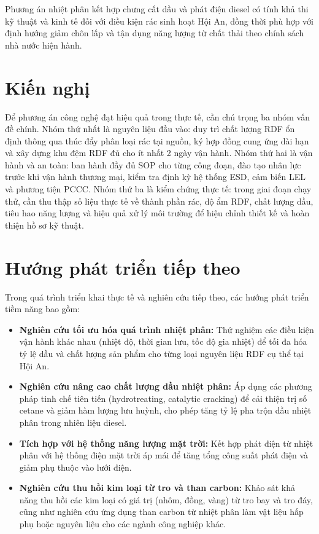 \documentclass[../main.tex]{subfiles}
\begin{document}
Phương án nhiệt phân kết hợp chưng cất dầu và phát điện diesel có tính khả thi kỹ thuật và kinh tế đối với điều kiện rác sinh hoạt Hội An, đồng thời phù hợp với định hướng giảm chôn lấp và tận dụng năng lượng từ chất thải theo chính sách nhà nước hiện hành.

\section*{Kiến nghị}

Để phương án công nghệ đạt hiệu quả trong thực tế, cần chú trọng ba nhóm vấn đề chính. Nhóm thứ nhất là nguyên liệu đầu vào: duy trì chất lượng RDF ổn định thông qua thúc đẩy phân loại rác tại nguồn, ký hợp đồng cung ứng dài hạn và xây dựng khu đệm RDF đủ cho ít nhất 2 ngày vận hành. Nhóm thứ hai là vận hành và an toàn: ban hành đầy đủ SOP cho từng công đoạn, đào tạo nhân lực trước khi vận hành thương mại, kiểm tra định kỳ hệ thống ESD, cảm biến LEL và phương tiện PCCC. Nhóm thứ ba là kiểm chứng thực tế: trong giai đoạn chạy thử, cần thu thập số liệu thực tế về thành phần rác, độ ẩm RDF, chất lượng dầu, tiêu hao năng lượng và hiệu quả xử lý môi trường để hiệu chỉnh thiết kế và hoàn thiện hồ sơ kỹ thuật.

\section*{Hướng phát triển tiếp theo}

Trong quá trình triển khai thực tế và nghiên cứu tiếp theo, các hướng phát triển tiềm năng bao gồm:

\begin{itemize}
    \item \textbf{Nghiên cứu tối ưu hóa quá trình nhiệt phân:} Thử nghiệm các điều kiện vận hành khác nhau (nhiệt độ, thời gian lưu, tốc độ gia nhiệt) để tối đa hóa tỷ lệ dầu và chất lượng sản phẩm cho từng loại nguyên liệu RDF cụ thể tại Hội An.
    \item \textbf{Nghiên cứu nâng cao chất lượng dầu nhiệt phân:} Áp dụng các phương pháp tinh chế tiên tiến (hydrotreating, catalytic cracking) để cải thiện trị số cetane và giảm hàm lượng lưu huỳnh, cho phép tăng tỷ lệ pha trộn dầu nhiệt phân trong nhiên liệu diesel.
    \item \textbf{Tích hợp với hệ thống năng lượng mặt trời:} Kết hợp phát điện từ nhiệt phân với hệ thống điện mặt trời áp mái để tăng tổng công suất phát điện và giảm phụ thuộc vào lưới điện.
    \item \textbf{Nghiên cứu thu hồi kim loại từ tro và than carbon:} Khảo sát khả năng thu hồi các kim loại có giá trị (nhôm, đồng, vàng) từ tro bay và tro đáy, cũng như nghiên cứu ứng dụng than carbon từ nhiệt phân làm vật liệu hấp phụ hoặc nguyên liệu cho các ngành công nghiệp khác.
\end{itemize}
\end{document}
